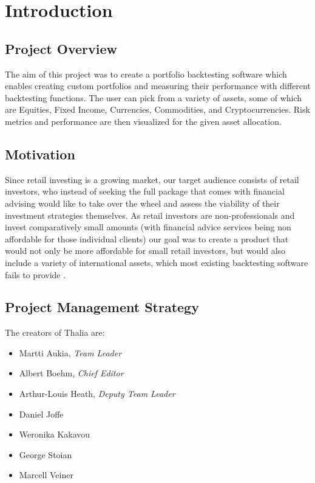 \documentclass[main.tex]{subfiles}
\begin{document}
\section{Introduction}
\subsection {Project Overview}

The aim of this project was to create a portfolio backtesting software which enables creating custom portfolios and measuring their performance with different backtesting functions. The user can pick from a variety of assets, some of which are Equities, Fixed Income, Currencies, Commodities, and Cryptocurrencies. Risk metrics and performance are then visualized for the given asset allocation.
\subsection{Motivation}
Since retail investing is a growing market, our target audience consists of retail investors, who instead of seeking the full package that comes with financial advising would like to take over the wheel and assess the viability of their investment strategies themselves. As retail investors are non-professionals and invest comparatively small amounts (with financial advice services being non affordable for those individual clients) our goal was to create a product that would not only be more affordable for small retail investors, but would also include a variety of international assets, which most existing backtesting software fails to provide \cite{WP}.

\subsection{Project Management Strategy}

The creators of Thalia are:
\begin{itemize}
    \item Martti Aukia, \textit{Team Leader}
	\item Albert Boehm, \textit{Chief Editor}
	\item Arthur-Louis Heath, \textit{Deputy Team Leader}
	\item Daniel Joffe
	\item Weronika Kakavou
	\item George Stoian
	\item Marcell Veiner
	
\end{itemize}
\end{document}
